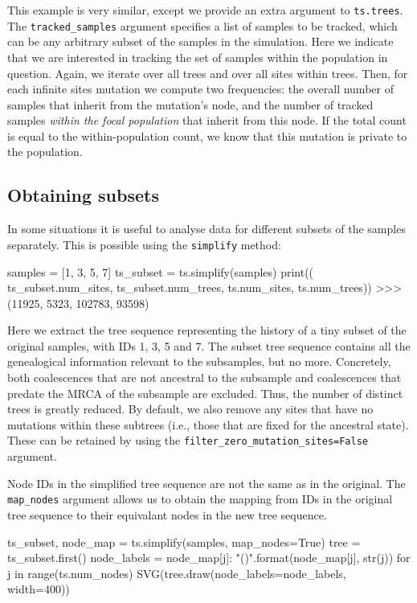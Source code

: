 \documentclass[graybox]{svmult}
\begin{document}
    This example is very similar, except we provide an extra argument to
\texttt{ts.trees}. The \texttt{tracked\_samples} argument specifies a list of samples to be tracked, which can be
any arbitrary subset of the samples in the simulation. Here we indicate
that we are interested in tracking the set of samples within the
population in question. Again, we iterate over all trees and over all
sites within trees. Then, for each infinite sites mutation we
compute two frequencies: the overall number of samples that inherit from
the mutation's node, and the number of tracked samples \emph{within the focal
population} that inherit from this node. If the total count is
equal to the within-population count, we know that this mutation is private to the population.

\subsection{Obtaining subsets}\label{obtaining-subsets}

In some situations it is useful to analyse data for different subsets of
the samples separately. This is possible using the \texttt{simplify}
method:

\begin{pythoncode}
samples = [1, 3, 5, 7]
ts_subset = ts.simplify(samples)
print((
    ts_subset.num_sites, ts_subset.num_trees,
    ts.num_sites, ts.num_trees))
>>> (11925, 5323, 102783, 93598)
\end{pythoncode}

Here we extract the tree sequence representing the history of a tiny
subset of the original samples, with IDs 1, 3, 5 and 7. The subset tree
sequence contains all the genealogical information relevant to the
subsamples, but no more. Concretely, both coalescences that are not ancestral to the
subsample and coalescences that predate
the MRCA of the subsample are excluded. Thus, the number of distinct trees is greatly
reduced. By default, we also remove any sites that have no mutations
within these subtrees (i.e., those that are fixed for the ancestral
state). These can be retained by using the
\texttt{filter\_zero\_mutation\_sites=False} argument.

Node IDs in the simplified tree sequence are not the same as in the
original. The \texttt{map\_nodes} argument allows us to obtain the
mapping from IDs in the original tree sequence to their equivalant nodes
in the new tree sequence.

\begin{pythoncode}
ts_subset, node_map = ts.simplify(samples, map_nodes=True)
tree = ts_subset.first()
node_labels = {
    node_map[j]: "{}({})".format(node_map[j], str(j))
    for j in range(ts.num_nodes)}
SVG(tree.draw(node_labels=node_labels, width=400))
\end{pythoncode}
\end{document}
